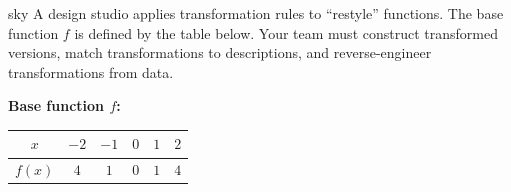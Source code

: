 \documentclass[10pt]{article}
\begin{document}
\namepartnerperiod

\vspace{0.08in}

\begin{scenariobox}{sky}
\small
A design studio applies transformation rules to ``restyle'' functions. The base function $f$
is defined by the table below. Your team must construct transformed versions, match
transformations to descriptions, and reverse-engineer transformations from data.

\medskip
\textbf{Base function $f$:}
\renewcommand{\arraystretch}{1.2}
\begin{tabular}{|c|c|c|c|c|c|}
\hline
$x$    & $-2$ & $-1$ & $0$ & $1$ & $2$ \\
\hline
$f(x)$ & $4$  & $1$  & $0$ & $1$ & $4$ \\
\hline
\end{tabular}
\end{scenariobox}

\vspace{0.08in}
\end{document}
